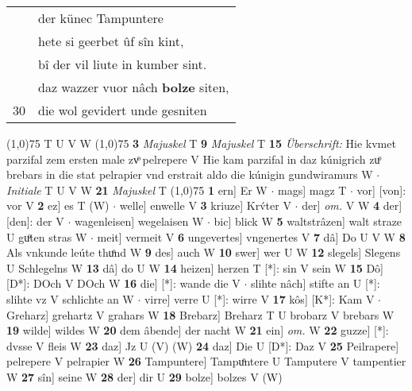 \documentclass[8pt,a4paper,notitlepage]{article}
\begin{document}
\begin{table}[ht]
\begin{minipage}[t]{0.5\linewidth}
\begin{tabular}{rl}
 & der künec Tampuntere\\ 
 & hete si geerbet ûf sîn kint,\\ 
 & bî der vil liute in kumber sint.\\ 
 & daz wazzer vuor nâch \textbf{bolze} siten,\\ 
30 & die wol gevidert unde gesniten\\ 
\end{tabular}
\scriptsize
\line(1,0){75} \newline
T U V W \newline
\line(1,0){75} \newline
\textbf{3} \textit{Majuskel} T  \textbf{9} \textit{Majuskel} T  \textbf{15} \textit{Überschrift:} Hie kvmet parzifal zem ersten male zvͦ pelrepere V  Hie kam parzifal in daz kúnigrich zuͦ brebars in die stat pelrapier vnd erstrait aldo die kúnigin gundwiramurs W   $\cdot$ \textit{Initiale} T U V W  \textbf{21} \textit{Majuskel} T  \newline
\line(1,0){75} \newline
\textbf{1} ern] Er W  $\cdot$ mags] magz T  $\cdot$ vor] [von]: vor V \textbf{2} ez] es T (W)  $\cdot$ welle] enwelle V \textbf{3} kriuze] Krv́ter V  $\cdot$ der] \textit{om.} V W \textbf{4} der] [den]: der V  $\cdot$ wagenleisen] wegelaisen W  $\cdot$ bic] blick W \textbf{5} waltstrâzen] walt straze U guͦten stras W  $\cdot$ meit] vermeit V \textbf{6} ungevertes] vngenertes V \textbf{7} dâ] Do U V W \textbf{8} Als vnkunde leúte thuͦnd W \textbf{9} des] auch W \textbf{10} swer] wer U W \textbf{12} slegels] Slegens U Schlegelns W \textbf{13} dâ] do U W \textbf{14} heizen] herzen T [*]: sin V sein W \textbf{15} Dô] [D*]: DOch V DOch W \textbf{16} die] [*]: wande die V  $\cdot$ slihte nâch] stifte an U [*]: slihte vz V schlichte an W  $\cdot$ virre] verre U [*]: wirre V \textbf{17} kôs] [K*]: Kam V  $\cdot$ Greharz] grehartz V grahars W \textbf{18} Brebarz] Breharz T U brobarz V brebars W \textbf{19} wilde] wildes W \textbf{20} dem âbende] der nacht W \textbf{21} ein] \textit{om.} W \textbf{22} guzze] [*]: dvsse V fleis W \textbf{23} daz] Jz U (V) (W) \textbf{24} daz] Die U [D*]: Daz V \textbf{25} Peilrapere] pelrepere V pelrapier W \textbf{26} Tampuntere] Tampuͦntere U Tamputere V tampentier W \textbf{27} sîn] seine W \textbf{28} der] dir U \textbf{29} bolze] bolzes V (W) \newline
\end{minipage}
\end{table}
\end{document}
